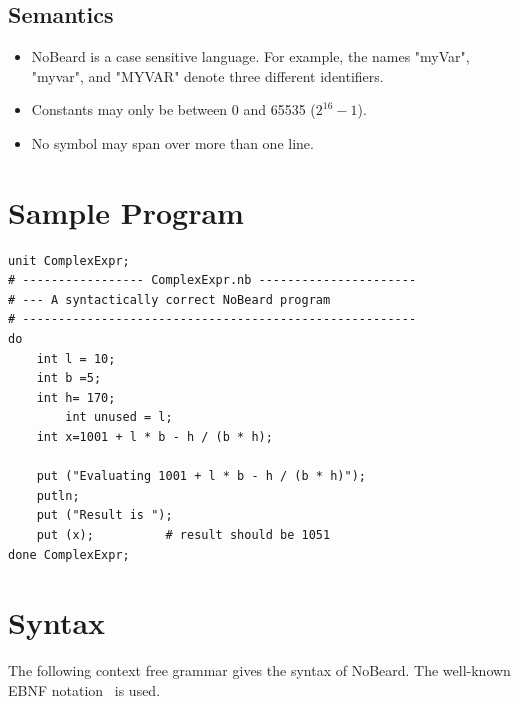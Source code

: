 \documentclass[11pt]{report}
\newcommand{\leongage}{NoBeard}
\begin{document}
\subsection{Semantics}
\begin{itemize}
	\item \leongage{} is a case sensitive language. For example, the names "myVar", "myvar", and "MYVAR" denote three different identifiers.
	\item Constants may only be between 0 and 65535 ($2^{16} - 1$).
	\item No symbol may span over more than one line.
\end{itemize}

\section{Sample Program}
\lstset{language=NoBeard}

\begin{lstlisting}
unit ComplexExpr;
# ----------------- ComplexExpr.nb ----------------------
# --- A syntactically correct NoBeard program
# -------------------------------------------------------
do
    int l = 10;
    int b =5;
    int h= 170;
        int unused = l;
    int x=1001 + l * b - h / (b * h);

    put ("Evaluating 1001 + l * b - h / (b * h)");
    putln;
    put ("Result is ");
    put (x);          # result should be 1051
done ComplexExpr;
\end{lstlisting}

\section{Syntax}
The following context free grammar gives the syntax of \leongage{}. The well-known EBNF notation~\cite{wirth_what_1977} is used.
\end{document}
